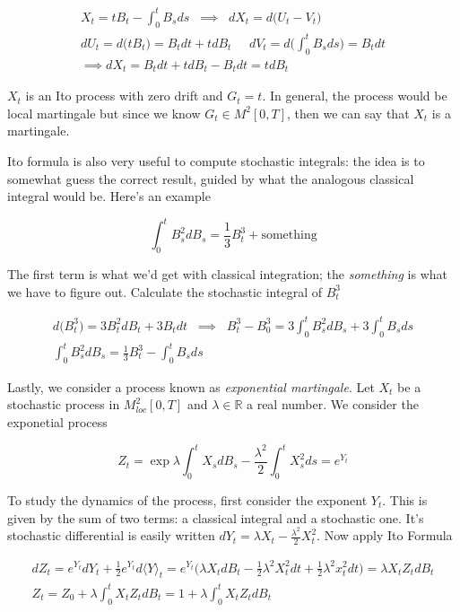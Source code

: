 \begin{gather*}
    X_t = t B_t - \int_0^t B_s ds \;\; \implies \;\; dX_t = d\big( U_t - V_t\big) \\
    dU_t = d \big( t B_t \big) = B_t dt + t dB_t \;\;\;\;\; dV_t = d \Bigg( \int_0^t B_s ds \Bigg) = B_t dt \\
    \implies dX_t = B_t dt + t dB_t - B_t dt = t dB_t
\end{gather*}

$X_t$ is an Ito process with zero drift and $G_t = t$. In general, the process would be local martingale but since we know $G_t \in M^2[0,T]$, then we can say that $X_t$ is a martingale. 

Ito formula is also very useful to compute stochastic integrals: the idea is to somewhat guess the correct result, guided by what the analogous classical integral would be. Here's an example


\begin{equation*}
    \int_0^t B_s^2 dB_s = \frac{1}{3} B_t^3 + \text{something}
\end{equation*}

The first term is what we'd get with classical integration; the \textit{something} is what we have to figure out. Calculate the stochastic integral of $B_t^3$

\begin{gather*}
    d\big( B_t^3 \big) = 3 B_t^2 dB_t + 3 B_t dt \;\; \implies \;\; B_t^3 - B_0^3 = 3\int_0^t B_s^2 dB_s + 3 \int_0^t B_s ds \\
    \int_0^t B_s^2 dB_s = \frac{1}{3} B_t^3 - \int_0^t B_s ds
\end{gather*}

Lastly, we consider a process known as \textit{exponential martingale}. Let $X_t$ be a stochastic process in $M^2_{loc}[0,T]$ and $\lambda \in \mathbb{R}$ a real number. We consider the exponetial process

\begin{equation}
    Z_t = \exp{ \lambda \int_0^t X_s dB_s - \frac{\lambda^2}{2} \int_0^t X_s^2 ds} = e^{Y_t}
\end{equation}

To study the dynamics of the process, first consider the exponent $Y_t$. This is given by the sum of two terms: a classical integral and a stochastic one. It's stochastic differential is easily written $dY_t = \lambda X_t - \frac{\lambda^2}{2} X_t^2$. Now apply Ito Formula

\begin{gather*}
    d Z_t = e^{Y_t} dY_t + \frac{1}{2} e^{Y_t} d \langle Y \rangle_t = e^{Y_t} \Big( \lambda X_t dB_t - \frac{1}{2} \lambda^2 X_t^2 dt + \frac{1}{2} \lambda^2 x_t^2 dt \Big) = \lambda X_t Z_t dB_t \\ 
    Z_t = Z_0 + \lambda \int_0^t X_t Z_t dB_t = 1+ \lambda \int_0^t X_t Z_t dB_t 
\end{gather*}

